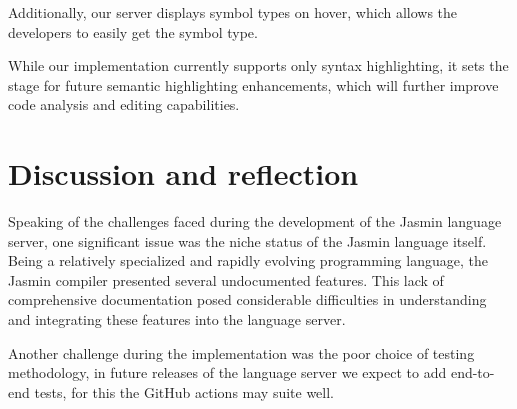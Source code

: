 Additionally, our server displays symbol types on hover, which allows the 
developers to easily get the symbol type.

While our implementation currently supports only syntax highlighting, it sets the
stage for future semantic highlighting enhancements, which will further improve
code analysis and editing capabilities.

\section{Discussion and reflection}

Speaking of the challenges faced during the development of the Jasmin
language server, one significant issue was the niche status of the Jasmin
language itself. Being a relatively specialized and rapidly evolving programming
language, the Jasmin compiler presented several undocumented features. This lack
of comprehensive documentation posed considerable difficulties in understanding
and integrating these features into the language server. 

Another challenge during the implementation was the poor choice of testing 
methodology, in future releases of the language server we expect to add end-to-end 
tests, for this the GitHub actions may suite well.
